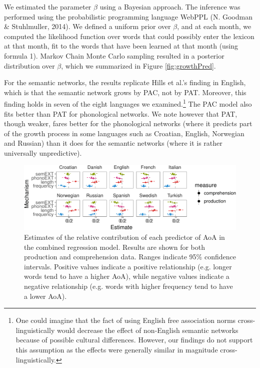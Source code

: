 \documentclass[english,floatsintext,man]{apa6}
\theoremstyle{definition}
\theoremstyle{definition}
\theoremstyle{definition}
\theoremstyle{remark}
\begin{document}
We estimated the parameter \(\beta\) using a Bayesian approach. The
inference was performed using the probabilistic programming language
WebPPL (N. Goodman \& Stuhlmuller, 2014). We defined a uniform prior
over \(\beta\), and at each month, we computed the likelihood function
over words that could possibly enter the lexicon at that month, fit to
the words that have been learned at that month (using formula 1). Markov
Chain Monte Carlo sampling resulted in a posterior distribution over
\(\beta\), which we summarized in Figure \ref{fig:growthPred}.

For the semantic networks, the results replicate Hills et al.'s finding
in English, which is that the semantic network grows by PAC, not by PAT.
Moreover, this finding holds in seven of the eight languages we
examined.\footnote{One could imagine that the fact of using English free association norms cross-linguistically would decrease the effect of non-English semantic networks because of possible cultural differences. However, our findings do not support this assumption as the effects were generally similar in magnitude cross-linguistically.}
The PAC model also fits better than PAT for phonological networks. We
note however that PAT, though weaker, fares better for the phonological
networks (where it predicts part of the growth process in some languages
such as Croatian, English, Norwegian and Russian) than it does for the
semantic networks (where it is rather universally unpredictive).

\begin{figure}[!h]
\includegraphics[width=\textwidth]{ms_files/figure-latex/staticPred-1} \caption{Estimates of the relative contribution of each predictor of AoA in the combined regression model. Results are shown for both production and comprehension data. Ranges indicate 95\% confidence intervals. Positive values indicate a positive relationship (e.g. longer words tend to have a higher AoA), while negative values indicate a negative relationship (e.g. words with higher frequency tend to have a lower AoA).}\label{fig:staticPred}
\end{figure}
\end{document}
